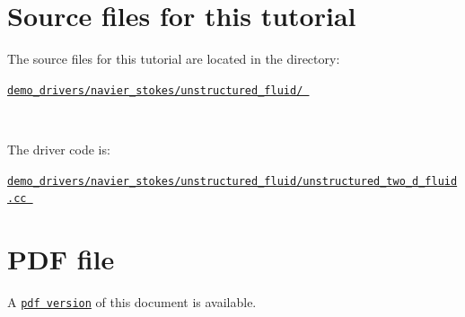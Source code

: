  

\hypertarget{index_sources}{}\section{Source files for this tutorial}\label{index_sources}

\begin{DoxyItemize}
\item The source files for this tutorial are located in the directory\+:~\newline
~\newline
\begin{center} \href{../../../../demo_drivers/navier_stokes/unstructured_fluid/}{\tt demo\+\_\+drivers/navier\+\_\+stokes/unstructured\+\_\+fluid/ } \end{center} ~\newline

\item The driver code is\+: ~\newline
~\newline
\begin{center} \href{../../../../demo_drivers/navier_stokes/unstructured_fluid/unstructured_two_d_fluid.cc}{\tt demo\+\_\+drivers/navier\+\_\+stokes/unstructured\+\_\+fluid/unstructured\+\_\+two\+\_\+d\+\_\+fluid.\+cc } \end{center} 
\end{DoxyItemize}



 

 \hypertarget{index_pdf}{}\section{P\+D\+F file}\label{index_pdf}
A \href{../latex/refman.pdf}{\tt pdf version} of this document is available. 
